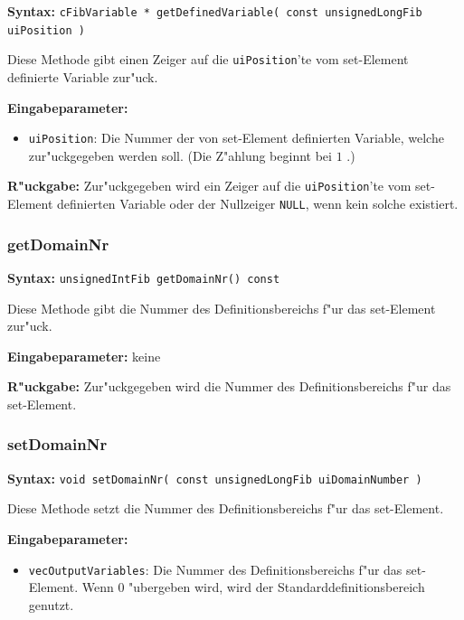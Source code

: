 \textbf{Syntax:} \verb|cFibVariable * getDefinedVariable( const unsignedLongFib uiPosition )|

\bigskip\noindent
Diese Methode gibt einen Zeiger auf die \verb|uiPosition|'te vom set-Element definierte Variable zur"uck.

\bigskip\noindent
\textbf{Eingabeparameter:}
\begin{itemize}
 \item \verb|uiPosition|: Die Nummer der von set-Element definierten Variable, welche zur"uckgegeben werden soll. (Die Z"ahlung beginnt bei $1$ .)
\end{itemize}

\bigskip\noindent
\textbf{R"uckgabe:} Zur"uckgegeben wird ein Zeiger auf die \verb|uiPosition|'te vom set-Element definierten Variable oder der Nullzeiger \verb|NULL|, wenn kein solche existiert.


\subsubsection{getDomainNr}

\textbf{Syntax:} \verb|unsignedIntFib getDomainNr() const|

\bigskip\noindent
Diese Methode gibt die Nummer des Definitionsbereichs f"ur das set-Element zur"uck.

\bigskip\noindent
\textbf{Eingabeparameter:} keine

\bigskip\noindent
\textbf{R"uckgabe:} Zur"uckgegeben wird die Nummer des Definitionsbereichs f"ur das set-Element.


\subsubsection{setDomainNr}

\textbf{Syntax:} \verb|void setDomainNr( const unsignedLongFib uiDomainNumber )|

\bigskip\noindent
Diese Methode setzt die Nummer des Definitionsbereichs f"ur das set-Element.

\bigskip\noindent
\textbf{Eingabeparameter:}
\begin{itemize}
 \item \verb|vecOutputVariables|: Die Nummer des Definitionsbereichs f"ur das set-Element. Wenn $0$ "ubergeben wird, wird der Standarddefinitionsbereich genutzt.
\end{itemize}

